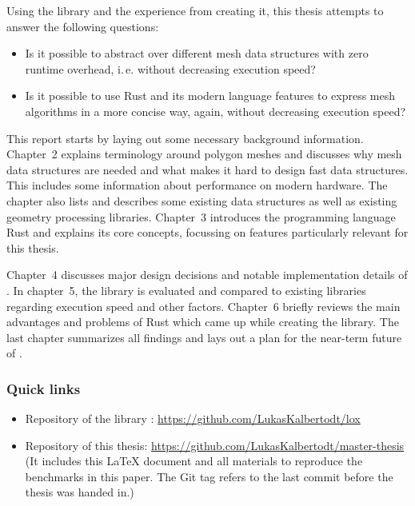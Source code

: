 \newpage

Using the library  and the experience from creating it, this thesis attempts to answer the following questions:

\begin{itemize}
  \item Is it possible to abstract over different mesh data structures with zero runtime overhead, i.\,e. without decreasing execution speed?
  \item Is it possible to use Rust and its modern language features to express mesh algorithms in a more concise way, again, without decreasing execution speed?
\end{itemize}


\vspace{1cm}

This report starts by laying out some necessary background information.
Chapter~2 explains terminology around polygon meshes and discusses why mesh data structures are needed and what makes it hard to design fast data structures.
This includes some information about performance on modern hardware.
The chapter also lists and describes some existing data structures as well as existing geometry processing libraries.
Chapter~3 introduces the programming language Rust and explains its core concepts, focussing on features particularly relevant for this thesis.

Chapter~4 discusses major design decisions and notable implementation details of .
In chapter~5, the library is evaluated and compared to existing libraries regarding execution speed and other factors.
Chapter~6 briefly reviews the main advantages and problems of Rust which came up while creating the library.
The last chapter summarizes all findings and lays out a plan for the near-term future of .


\vfill

\subsubsection*{Quick links}
\begin{itemize}
  \item Repository of the library : \textcolor{link-blue}{\url{https://github.com/LukasKalbertodt/lox}}
  \item Repository of this thesis: \textcolor{link-blue}{\url{https://github.com/LukasKalbertodt/master-thesis}}\\
  {\footnotesize (It includes this \LaTeX{} document and all materials to reproduce the benchmarks in this paper.
  The Git tag  refers to the last commit before the thesis was handed in.)}
\end{itemize}

\vspace{2cm}
